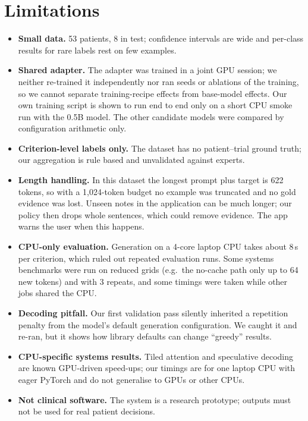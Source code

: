 \section{Limitations}
\label{sec:limits}
\begin{itemize}
\item \textbf{Small data.} 53 patients, 8 in test; confidence intervals are wide and per-class results for rare labels rest on few examples.
\item \textbf{Shared adapter.} The adapter was trained in a joint GPU session; we neither re-trained it independently nor ran seeds or ablations of the training, so we cannot separate training-recipe effects from base-model effects. Our own training script is shown to run end to end only on a short CPU smoke run with the 0.5B model. The other candidate models were compared by configuration arithmetic only.
\item \textbf{Criterion-level labels only.} The dataset has no patient--trial ground truth; our aggregation is rule based and unvalidated against experts.
\item \textbf{Length handling.} In this dataset the longest prompt plus target is 622 tokens, so with a 1{,}024-token budget no example was truncated and no gold evidence was lost. Unseen notes in the application can be much longer; our policy then drops whole sentences, which could remove evidence. The app warns the user when this happens.
\item \textbf{CPU-only evaluation.} Generation on a 4-core laptop CPU takes about 8\,s per criterion, which ruled out repeated evaluation runs. Some systems benchmarks were run on reduced grids (e.g.\ the no-cache path only up to 64 new tokens) and with 3 repeats, and some timings were taken while other jobs shared the CPU.
\item \textbf{Decoding pitfall.} Our first validation pass silently inherited a repetition penalty from the model's default generation configuration. We caught it and re-ran, but it shows how library defaults can change ``greedy'' results.
\item \textbf{CPU-specific systems results.} Tiled attention and speculative decoding are known GPU-driven speed-ups; our timings are for one laptop CPU with eager PyTorch and do not generalise to GPUs or other CPUs.
\item \textbf{Not clinical software.} The system is a research prototype; outputs must not be used for real patient decisions.
\end{itemize}
